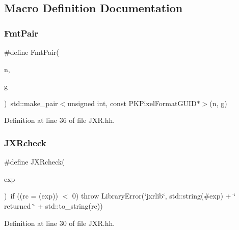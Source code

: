 \subsection{Macro Definition Documentation}
\mbox{\label{_j_x_r_8hh_a7977c90173d0c13e4d47326e9075f79e}} 
\subsubsection{\texorpdfstring{Fmt\+Pair}{FmtPair}}
{\footnotesize\ttfamily \#define Fmt\+Pair(\begin{DoxyParamCaption}\item[{}]{n,  }\item[{}]{g }\end{DoxyParamCaption})~std\+::make\+\_\+pair$<$unsigned int, const P\+K\+Pixel\+Format\+G\+U\+ID$\ast$$>$(n, g)}



Definition at line 36 of file J\+X\+R.\+hh.

\mbox{\label{_j_x_r_8hh_a405f7ccac8ce23f68c4294a39f8fe0f5}} 
\subsubsection{\texorpdfstring{J\+X\+Rcheck}{JXRcheck}}
{\footnotesize\ttfamily \#define J\+X\+Rcheck(\begin{DoxyParamCaption}\item[{}]{exp }\end{DoxyParamCaption})~if ((rc = (exp)) $<$ 0) throw Library\+Error(\char`\"{}jxrlib\char`\"{}, std\+::string(\#exp) + \char`\"{} returned \char`\"{} + std\+::to\+\_\+string(rc))}



Definition at line 30 of file J\+X\+R.\+hh.


